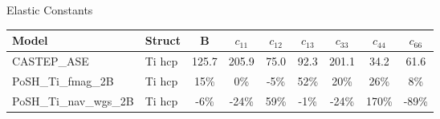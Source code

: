 \documentclass[preview]{standalone}
\begin{document}
\begin{center}
\textnormal{Elastic Constants} \\
\vspace{2mm}
\begin{tabular}{ l l c c c c c c c } \toprule 
Model & Struct & B & $c_{11}$ & $c_{12}$ & $c_{13}$ & $c_{33}$ & $c_{44}$ & $c_{66}$\\ \midrule 
CASTEP\_ASE & Ti hcp & 125.7 & 205.9 & 75.0 & 92.3 & 201.1 & 34.2 & 61.6\\ 
PoSH\_Ti\_fmag\_2B & Ti hcp & 15\% & 0\% & -5\% & 52\% & 20\% & 26\% & 8\%\\ 
PoSH\_Ti\_nav\_wgs\_2B & Ti hcp & -6\% & -24\% & 59\% & -1\% & -24\% & 170\% & -89\%\\ 
\end{tabular} \bigskip 
\end{center}
\end{document}
